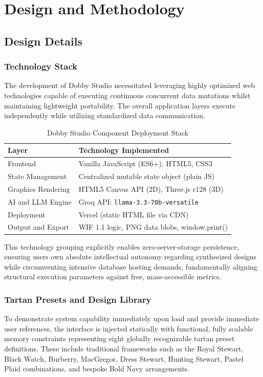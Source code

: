 \chapter{Design and Methodology}

\section{Design Details}

\subsection{Technology Stack}
The development of Dobby Studio necessitated leveraging highly optimized web technologies capable of executing continuous concurrent data mutations whilst maintaining lightweight portability. The overall application layers execute independently while utilizing standardized data communication.

\begin{table}[H]
\centering
\caption{Dobby Studio Component Deployment Stack}
\begin{tabular}{|p{3.5cm}|p{8cm}|}
\hline
\textbf{Layer} & \textbf{Technology Implemented} \\
\hline
Frontend & Vanilla JavaScript (ES6+), HTML5, CSS3 \\
\hline
State Management & Centralized mutable state object (plain JS) \\
\hline
Graphics Rendering & HTML5 Canvas API (2D), Three.js r128 (3D) \\
\hline
AI and LLM Engine & Groq API: \texttt{llama-3.3-70b-versatile} \\
\hline
Deployment & Vercel (static HTML file via CDN) \\
\hline
Output and Export & WIF 1.1 logic, PNG data blobs, window.print() \\
\hline
\end{tabular}
\end{table}

This technology grouping explicitly enables zero-server-storage persistence, ensuring users own absolute intellectual autonomy regarding synthesized designs while circumventing intensive database hosting demands, fundamentally aligning structural execution parameters against free, mass-accessible metrics.

\subsection{Tartan Presets and Design Library}
To demonstrate system capability immediately upon load and provide immediate user references, the interface is injected statically with functional, fully scalable memory constraints representing eight globally recognizable tartan preset definitions. These include traditional frameworks such as the Royal Stewart, Black Watch, Burberry, MacGregor, Dress Stewart, Hunting Stewart, Pastel Plaid combinations, and bespoke Bold Navy arrangements. 

